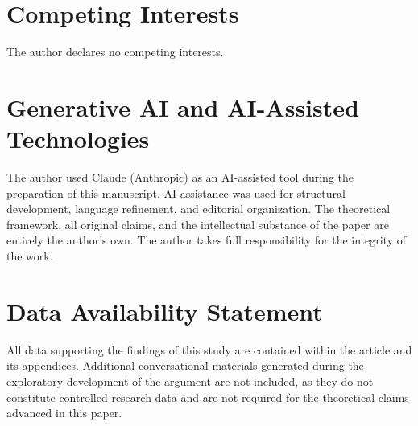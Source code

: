 \documentclass[12pt]{article}
\begin{document}
\section*{Competing Interests}

The author declares no competing interests.

\section*{Generative AI and AI-Assisted Technologies}

The author used Claude (Anthropic) as an AI-assisted tool during the preparation of this manuscript. AI assistance was used for structural development, language refinement, and editorial organization. The theoretical framework, all original claims, and the intellectual substance of the paper are entirely the author's own. The author takes full responsibility for the integrity of the work.

\section*{Data Availability Statement}

All data supporting the findings of this study are contained within the article and its appendices. Additional conversational materials generated during the exploratory development of the argument are not included, as they do not constitute controlled research data and are not required for the theoretical claims advanced in this paper.
\end{document}
